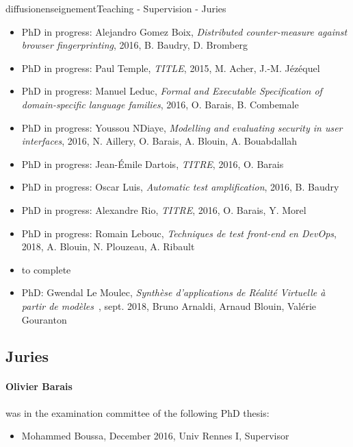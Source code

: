 \documentclass{ra2018}
\begin{document}
\begin{module}{diffusion}{enseignement}{Teaching - Supervision - Juries}
\begin{itemize}
\item PhD in progress: Alejandro Gomez Boix, \emph{Distributed counter-measure against browser fingerprinting}, 2016, B. Baudry, D. Bromberg
\item PhD in progress: Paul Temple, \emph{TITLE}, 2015, M. Acher, J.-M. Jézéquel
\item PhD in progress: Manuel Leduc, \emph{Formal and Executable Specification of domain-specific language families}, 2016, O. Barais, B. Combemale
\item PhD in progress: Youssou NDiaye, \emph{Modelling and evaluating security in user interfaces}, 2016, N. Aillery, O. Barais, A. Blouin, A. Bouabdallah
\item PhD in progress: Jean-Émile Dartois, \emph{TITRE}, 2016, O. Barais
\item PhD in progress: Oscar Luis, \emph{Automatic test amplification}, 2016, B. Baudry
\item PhD in progress: Alexandre Rio, \emph{TITRE}, 2016, O. Barais, Y. Morel
\item PhD in progress: Romain Lebouc, \emph{Techniques de test front-end en DevOps}, 2018, A. Blouin, N. Plouzeau, A. Ribault
\item to complete %

\item PhD: Gwendal Le Moulec, \emph{Synthèse d'applications de Réalité Virtuelle à partir de modèles}~\cite{lemoulec:tel-01959918}, sept. 2018, Bruno Arnaldi, Arnaud Blouin, Valérie Gouranton

\end{itemize} 


\subsection {Juries}

\paragraph*{Olivier Barais} was in the examination committee of the following PhD thesis: 
\begin{itemize}
	\item Mohammed Boussa, December 2016, Univ Rennes I, Supervisor
\end{itemize}


\end{module}
\end{document}
